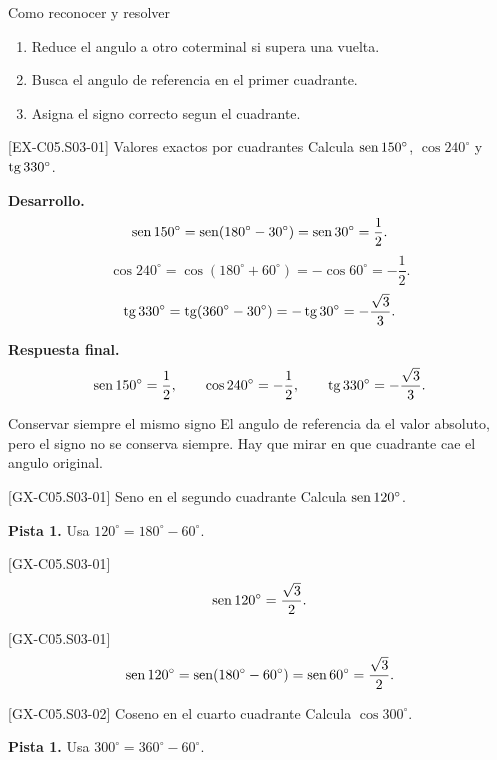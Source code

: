 \begin{methodbox}{Como reconocer y resolver}
\begin{enumerate}
  \item Reduce el angulo a otro coterminal si supera una vuelta.
  \item Busca el angulo de referencia en el primer cuadrante.
  \item Asigna el signo correcto segun el cuadrante.
\end{enumerate}
\end{methodbox}

\begin{solvedexample}{[EX-C05.S03-01] Valores exactos por cuadrantes}
Calcula \(\operatorname{sen} 150^\circ\), \(\cos 240^\circ\) y \(\operatorname{tg} 330^\circ\).

\textbf{Desarrollo.}
\[
\operatorname{sen} 150^\circ=\operatorname{sen}(180^\circ-30^\circ)=\operatorname{sen} 30^\circ=\frac{1}{2}.
\]
\[
\cos 240^\circ=\cos(180^\circ+60^\circ)=-\cos 60^\circ=-\frac{1}{2}.
\]
\[
\operatorname{tg} 330^\circ=\operatorname{tg}(360^\circ-30^\circ)=-\operatorname{tg} 30^\circ=-\frac{\sqrt{3}}{3}.
\]

\textbf{Respuesta final.}
\[
\operatorname{sen} 150^\circ=\frac{1}{2},
\qquad
\cos 240^\circ=-\frac{1}{2},
\qquad
\operatorname{tg} 330^\circ=-\frac{\sqrt{3}}{3}.
\]
\end{solvedexample}

\begin{commonerror}{Conservar siempre el mismo signo}
El angulo de referencia da el valor absoluto, pero el signo no se conserva siempre. Hay que
mirar en que cuadrante cae el angulo original.
\end{commonerror}

\begin{guidedexercise}{[GX-C05.S03-01] Seno en el segundo cuadrante}
Calcula \(\operatorname{sen} 120^\circ\).

\textbf{Pista 1.} Usa \(120^\circ=180^\circ-60^\circ\).
\end{guidedexercise}

\begin{shortanswer}{[GX-C05.S03-01]}
\[
\operatorname{sen} 120^\circ=\frac{\sqrt{3}}{2}.
\]
\end{shortanswer}

\begin{fullsolution}{[GX-C05.S03-01]}
\[
\operatorname{sen} 120^\circ=\operatorname{sen}(180^\circ-60^\circ)=\operatorname{sen} 60^\circ=\frac{\sqrt{3}}{2}.
\]
\end{fullsolution}

\begin{guidedexercise}{[GX-C05.S03-02] Coseno en el cuarto cuadrante}
Calcula \(\cos 300^\circ\).

\textbf{Pista 1.} Usa \(300^\circ=360^\circ-60^\circ\).
\end{guidedexercise}


